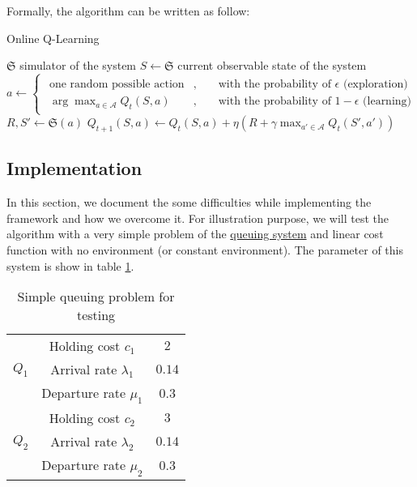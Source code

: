 \documentclass[
  a4paper, xcolor = usenames,dvipsnames]{article}
\begin{document}
Formally, the algorithm can be written as follow:

\begin{algorithm}
\caption{Online Q-Learning}\label{alg:on-q-learning}
$\mathfrak{S}$ simulator of the system\;
 {
  $S \gets \mathfrak{S}$ current observable state of the system\;
  $a \gets 
    \begin{cases}
    \begin{aligned}
      \text{one random possible action}&, && \text{ with the probability of } \epsilon \text{ (exploration)}\\ 
      \arg\max_{a \in \mathcal{A}} Q_{t}(S, a)&, && \text{ with the probability of } 1 - \epsilon \text{ (learning)}
    \end{aligned}
    \end{cases}
  $\\
  $R, S' \gets \mathfrak{S}(a)$\;
  $Q_{t+1}(S, a) \gets Q_{t}(S, a) + \eta (R + \gamma \max_{a' \in \mathcal{A}} Q_{t}(S', a'))$ \;
}
\end{algorithm}

\hypertarget{implementation}{%
\subsection{Implementation}\label{implementation}}

In this section, we document the some difficulties while implementing the framework and how we overcome it. For illustration purpose, we will test the algorithm with a very simple problem of the \protect\hyperlink{queuing-system}{queuing system}
and linear cost function with no environment (or constant environment). The parameter of this system is show in table \ref{tab:q-learning-test}.

\begin{table}[ht]
\caption{Simple queuing problem for testing}
\begin{center}
\begin{tabular}{c c c}
    \hline
    \multirow{3}{*}{$Q_{1}$} & Holding cost $c_{1}$ & $2$ \\
    & Arrival rate $\lambda_{1}$ & $0.14$ \\
    & Departure rate $\mu_{1}$ & $0.3$ \\
    \cline{2-3}
    \multirow{3}{*}{$Q_{2}$} & Holding cost $c_{2}$ & $3$ \\
    & Arrival rate $\lambda_{2}$ & $0.14$ \\
    & Departure rate $\mu_{2}$ & $0.3$ \\    
    \hline
\end{tabular}
\end{center}
\label{tab:q-learning-test}
\end{table}
\end{document}
